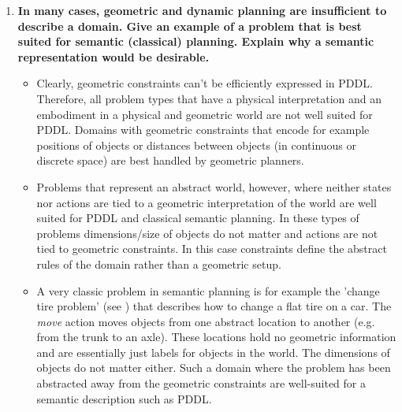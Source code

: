 \documentclass[12pt]{article}
\begin{document}
\begin{enumerate}
 \item \textbf{In many cases, geometric and dynamic planning are insufficient to describe a domain. Give
an example of a problem that is best suited for semantic (classical) planning. Explain why a
semantic representation would be desirable.}
  \begin{itemize}
   \item Clearly, geometric constraints can't be efficiently expressed in PDDL. Therefore, all problem types that have a physical interpretation and an embodiment in a physical and geometric world are not well suited for PDDL. Domains with geometric constraints that encode for example positions of objects or distances between objects (in continuous or discrete space) are best handled by geometric planners. 
   \item Problems that represent an abstract world, however, where neither states nor actions are tied to a geometric interpretation of the world are well suited for PDDL and classical semantic planning. In these types of problems dimensions/size of objects do not matter and actions are not tied to geometric constraints. In this case constraints define the abstract rules of the domain rather than a geometric setup. 
   \item A very classic problem in semantic planning is for example the 'change tire problem' (see \cite{Russell2010}) that describes how to change a flat tire on a car. The \textit{move} action moves objects from one abstract location to another (e.g. from the trunk to an axle). These locations hold no geometric information and are essentially just labels for objects in the world. The dimensions of objects do not matter either. Such a domain where the problem has been abstracted away from the geometric constraints are well-suited for a semantic description such as PDDL.
  \end{itemize}

\end{enumerate}
\end{document}

